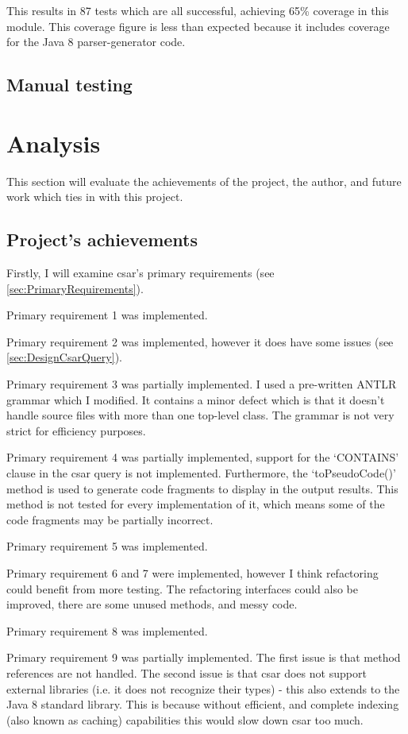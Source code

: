 \documentclass[12pt, letterpaper]{article}
\begin{document}
This results in 87 tests which are all successful, achieving 65\% coverage in this module.
This coverage figure is less than expected because it includes coverage for the Java 8 parser-generator code.

\subsection{Manual testing}

\section{Analysis}
This section will evaluate the achievements of the project, the author, and future work which ties in with this project.

\subsection{Project's achievements}
Firstly, I will examine csar's primary requirements (see \ref{sec:PrimaryRequirements}).

Primary requirement 1 was implemented. 

Primary requirement 2 was implemented, however it does have some issues (see \ref{sec:DesignCsarQuery}).

Primary requirement 3 was partially implemented.
I used a pre-written ANTLR grammar which I modified. 
It contains a minor defect which is that it doesn't handle source files with more than one top-level class.
The grammar is not very strict for efficiency purposes.

Primary requirement 4 was partially implemented, support for the `CONTAINS' clause in the csar query is not implemented.
Furthermore, the `toPseudoCode()' method is used to generate code fragments to display in the output results.
This method is not tested for every implementation of it, which means some of the code fragments may be partially incorrect.

Primary requirement 5 was implemented.

Primary requirement 6 and 7 were implemented, however I think refactoring could benefit from more testing.
The refactoring interfaces could also be improved, there are some unused methods, and messy code.

Primary requirement 8 was implemented.

Primary requirement 9 was partially implemented. The first issue is that method references are not handled.
The second issue is that csar does not support external libraries (i.e. it does not recognize their types) - this also extends to the Java 8 standard library.
This is because without efficient, and complete indexing (also known as caching) capabilities this would slow down csar too much.
\end{document}

